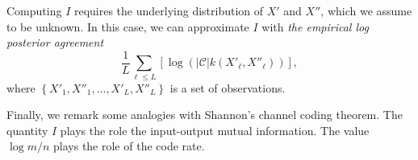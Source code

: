 Computing $I$ requires the underlying distribution of $X'$ and $X''$, which we assume to be unknown. In this case, we can approximate $I$ with \emph{the empirical log posterior agreement}
%
\begin{equation}
\frac{1}{L}\sum_{\ell \leq L} \left[\log \left(\left|\mathcal{C}\right|k(X'_\ell, X''_\ell)\right)\right],
\label{eq:emp_log_pa}
\end{equation}
%
where $\left\{X'_1, X''_1, \ldots, X'_L, X''_L\right\}$ is a set of observations.

Finally, we remark some analogies with Shannon's channel coding theorem. The quantity $I$ plays the role the input-output mutual information. The value $\log m / n$ plays the role of the code rate.
%
%
%
%
%
